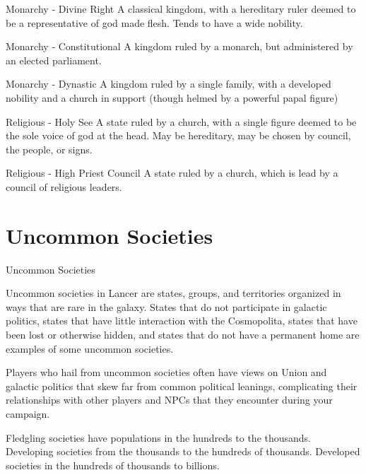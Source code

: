  Monarchy - Divine Right                               A classical kingdom, with a hereditary ruler  
                                                       deemed to be a representative of god made  
                                                       flesh. Tends to have a wide nobility.  

 Monarchy - Constitutional                             A kingdom ruled by a monarch, but  
                                                       administered by an elected parliament.  

 Monarchy - Dynastic                                   A kingdom ruled by a single family, with a  
                                                       developed nobility and a church in support  
                                                       (though helmed by a powerful papal figure) 

 Religious - Holy See                                  A state ruled by a church, with a single figure  
                                                       deemed to be the sole voice of god at the  
                                                       head. May be hereditary, may be chosen by  
                                                       council, the people, or signs.  

 Religious - High Priest Council                       A state ruled by a church, which is lead by a  
                                                       council of religious leaders.  
\section{Uncommon Societies}
Uncommon Societies  

Uncommon societies in Lancer are states, groups, and territories organized in ways that are rare  
in the galaxy. States that do not participate in galactic politics, states that have little interaction  
with the Cosmopolita, states that have been lost or otherwise hidden, and states that do not  
have a permanent home are examples of some uncommon societies. 
 

Players who hail from uncommon societies often have views on Union and galactic politics that  
skew far from common political leanings, complicating their relationships with other players and  
NPCs that they encounter during your campaign. 
 

Fledgling societies have populations in the hundreds to the thousands. Developing societies  
from the thousands to the hundreds of thousands. Developed societies in the hundreds of  
thousands to billions.  
 

